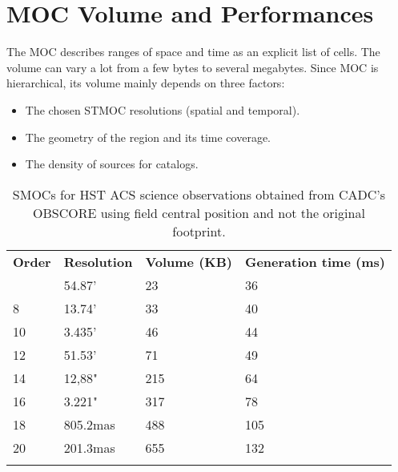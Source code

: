 \section{MOC Volume and Performances}
\label{app:perf}
The MOC describes ranges of space and time as an explicit list of cells. The
volume can vary a lot from a few bytes to several megabytes.
Since MOC is hierarchical, its volume mainly depends on three factors:
\begin{itemize}
\item The chosen STMOC resolutions (spatial and temporal).
\item The geometry of the region and its time coverage.
\item The density of sources for catalogs.   
\end{itemize}

\begin{table}[!htbp]
\begin{center}
{\scriptsize
\begin{tabular}{p{}p{}p{}p{}}
\sptablerule
\textbf{Order} & \textbf{Resolution} & \textbf{Volume (KB)} & \textbf{Generation \newline time (ms)}\\
\sptablerule
6	&	54.87'	&	23	&	36 \\
8	&	13.74'	&	33	&	40 \\
10	&	3.435'	&	46	&	44 \\
12	&	51.53'	&	71	&	49 \\
14	&	12,88"	&	215	&	64 \\
16	&	3.221"	&	317	&	78 \\
18	&	805.2mas	&	488	&	105 \\
20	&	201.3mas	&	655	&	132 \\
\sptablerule
\end{tabular}
\caption[SMOC performances]{SMOCs for HST ACS science observations
  obtained from CADC's OBSCORE using field central position and
  not the original footprint.}
\normalsize
}
\label{table:smocsizeacs}
\end{center}
\end{table}


